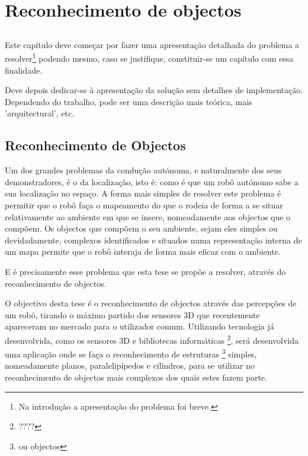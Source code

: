 \chapter{Reconhecimento de objectos}\label{chap:chap3}

\section*{}

Este capítulo deve começar por fazer uma apresentação detalhada do
problema a resolver\footnote{Na introdução a apresentação do
  problema foi breve.} podendo mesmo, caso se justifique,
constituir-se um capítulo com essa finalidade.

Deve depois dedicar-se à apresentação da solução sem detalhes de
implementação. 
Dependendo do trabalho, pode ser uma descrição mais teórica, mais
'arquitectural', etc.

\section{Reconhecimento de Objectos}

Um dos grandes problemas da condução autónoma, e naturalmente dos seus demonstradores, é o
da localização, isto é: como é que um robô autónomo sabe a sua localização no espaço. A 
forma mais simples de resolver este problema é permitir que o robô faça o mapeamento do que
o rodeia de forma a se situar relativamente ao ambiente em que se insere, nomeadamente aos 
objectos que o compõem.
Os objectos que compõem o seu ambiente, sejam eles simples ou devidadamente, complexos
identificados e situados numa representação interna de um mapa permite que o robô interaja de 
forma mais eficaz com o ambiente.

E é precisamente esse problema que esta tese se propõe a resolver, através do reconhecimento de
objectos.

O objectivo desta tese é o reconhecimento de objectos através das percepções de um 
robô, tirando o máximo partido dos sensores 3D que recentemente apareceram no mercado para o
utilizador comum. Utilizando tecnologia já desenvolvida, como os sensores 3D e bibliotecas
informáticas \footnote{????}, será desenvolvida uma aplicação onde se faça o reconhecimento de
estruturas \footnote{ou objectos} simples, nomeadamente planos, paralelipípedos e cilindros, para
se utilizar no reconhecimento de objectos mais complexos dos quais estes fazem parte.

